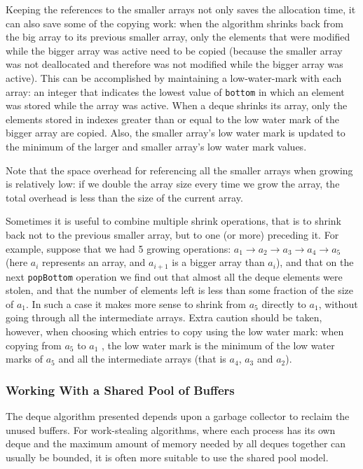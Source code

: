 Keeping the references to the smaller arrays not only saves the
allocation time, it can also save some of the copying work: when the
algorithm shrinks back from the big array to its previous smaller
array, only the elements that were modified while the bigger array was
active need to be copied (because the smaller array was not
deallocated and therefore was not modified while the bigger array was
active). This can be accomplished by maintaining a low-water-mark with
each array: an integer that indicates the lowest value of
\lstinline!bottom! in which an element was stored while the array was
active. When a deque shrinks its array, only the elements stored in
indexes greater than or equal to the low water mark of the bigger
array are copied. Also, the smaller array's low water mark is updated
to the minimum of the larger and smaller array's low water mark
values.

Note that the space overhead for referencing all the smaller arrays
when growing is relatively low: if we double the array size every time
we grow the array, the total overhead is less than the size of the
current array.


Sometimes it is useful to combine multiple shrink operations, that is
to shrink back not to the previous smaller array, but to one (or more)
preceding it. For example, suppose that we had 5 growing operations:
$a_1 \rightarrow a_2 \rightarrow a_3 \rightarrow a_4 \rightarrow a_5$
(here $a_i$ represents an array, and $a_{i+1}$ is a bigger array than
$a_i$), and that on the next \lstinline!popBottom! operation we find
out that almost all the deque elements were stolen, and that the
number of elements left is less than some fraction of the size of
$a_1$. In such a case it makes more sense to shrink from $a_5$
directly to $a_1$, without going through all the intermediate
arrays. Extra caution should be taken, however, when choosing which
entries to copy using the low water mark: when copying from $a_5$ to
$a_1$ , the low water mark is the minimum of the low water marks of
$a_5$ and all the intermediate arrays (that is $a_4$, $a_3$ and
$a_2$).

\subsubsection{Working With a Shared Pool of Buffers}

The deque algorithm presented depends upon a garbage collector to
reclaim the unused buffers. For work-stealing algorithms, where each
process has its own deque and the maximum amount of memory needed by
all deques together can usually be bounded, it is often more suitable
to use the shared pool model.

